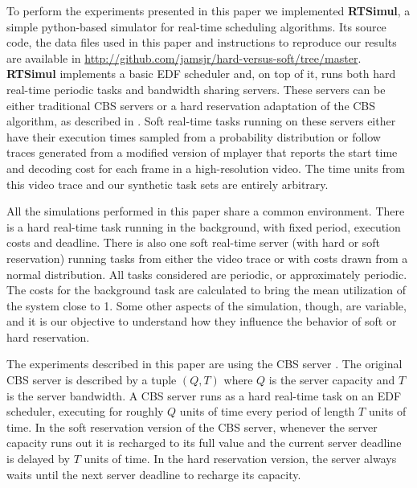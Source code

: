 \documentclass[times, 10pt,twocolumn]{article}
\newcommand{\simul}{\textbf{RTSimul}} %
\begin{document}
\label{sec:simul-envir}

To perform the experiments presented in this paper we implemented
\simul{}, a simple python-based simulator for real-time scheduling
algorithms. Its source code, the data files used in this paper and
instructions to reproduce our results are available in
\url{http://github.com/jamsjr/hard-versus-soft/tree/master}. \simul{}
implements a basic EDF scheduler and, on top of it, runs both hard
real-time periodic tasks and bandwidth sharing servers. These servers
can be either traditional CBS servers \cite{abeni.ea98:integrating} or
a hard reservation adaptation of the CBS algorithm, as described in
\cite{buttazzo05:soft}. Soft real-time tasks running on these servers
either have their execution times sampled from a probability
distribution or follow traces generated from a modified version of
mplayer that reports the start time and decoding cost for each frame
in a high-resolution video. The time units from this video trace and
our synthetic task sets are entirely arbitrary.

All the simulations performed in this paper share a common
environment. There is a hard real-time task running in the background,
with fixed period, execution costs and deadline. There is also one
soft real-time server (with hard or soft reservation) running tasks
from either the video trace or with costs drawn from a normal
distribution. All tasks considered are periodic, or approximately
periodic. The costs for the background task are calculated to bring
the mean utilization of the system close to 1. Some other aspects of
the simulation, though, are variable, and it is our objective to
understand how they influence the behavior of soft or hard
reservation.

\label{sec:reserv-mech}

The experiments described in this paper are using the CBS server
\cite{abeni.ea98:integrating}. The original CBS server is described by
a tuple $(Q,T)$ where $Q$ is the server capacity and $T$ is the server
bandwidth. A CBS server runs as a hard real-time task on an EDF
scheduler, executing for roughly $Q$ units of time every period of
length $T$ units of time. In the soft reservation version of the CBS
server, whenever the server capacity runs out it is recharged to its
full value and the current server deadline is delayed by $T$ units of
time. In the hard reservation version, the server always waits until
the next server deadline to recharge its capacity.
\end{document}
